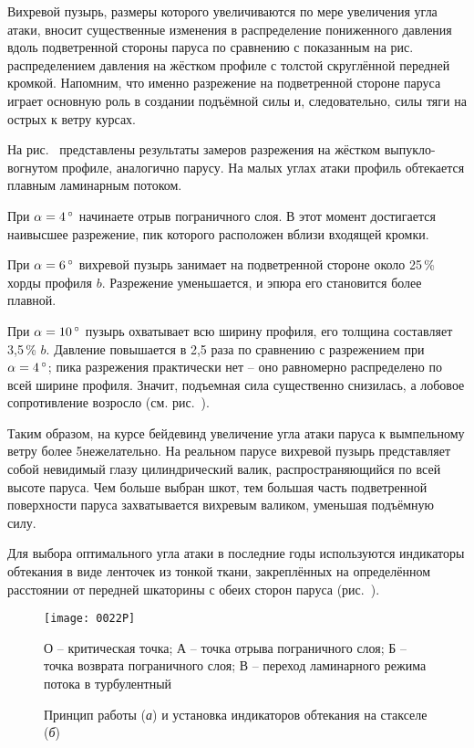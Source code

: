 Вихревой пузырь, размеры которого увеличиваются по мере увеличения угла атаки, вносит существенные изменения в распределение пониженного давления вдоль подветренной стороны паруса по сравнению с показанным на рис.~ распределением давления на жёстком профиле с толстой скруглённой передней кромкой. Напомним, что именно разрежение на подветренной стороне паруса играет основную роль в создании подъёмной силы и, следовательно, силы тяги на острых к ветру курсах. 

На рис.~ представлены результаты замеров разрежения на жёстком выпукло-вогнутом профиле, аналогично парусу. На малых углах атаки профиль обтекается плавным ламинарным потоком. 

При $\alpha = 4\,^\circ$ начинаете отрыв пограничного слоя. В этот момент достигается наивысшее разрежение, пик которого расположен вблизи входящей кромки.
 
При $\alpha = 6\,^\circ$ вихревой пузырь занимает на подветренной стороне около 25\,\% хорды профиля $b$. Разрежение уменьшается, и эпюра его становится более плавной. 

При $\alpha = 10\,^\circ$ пузырь охватывает всю ширину профиля, его толщина составляет 3,5\,\% $b$. Давление повышается в 2,5 раза по сравнению с разрежением при $\alpha = 4\,^\circ$; пика разрежения практически нет \--- оно равномерно распределено по всей ширине профиля. Значит, подъемная сила существенно снизилась, а лобовое сопротивление возросло (см. рис.~). 

Таким образом, на курсе бейдевинд увеличение угла атаки паруса к вымпельному ветру более 5\gr нежелательно. На реальном парусе вихревой пузырь представляет собой невидимый глазу цилиндрический валик, распространяющийся по всей высоте паруса. Чем больше выбран шкот, тем большая часть подветренной поверхности паруса захватывается вихревым валиком, уменьшая подъёмную силу. 

Для выбора оптимального угла атаки в последние годы используются индикаторы обтекания в виде ленточек из тонкой ткани, закреплённых на определённом расстоянии от передней шкаторины с обеих сторон паруса (рис.~).

\begin{figure*}[htb]
  \centering
  \texttt{[image: 0022P]}
  \caption{Принцип работы (\textit{а}) и установка индикаторов обтекания на стакселе (\textit{б})}
  \label{fig:22}
  \small
  \centering{}
  О \--- критическая точка; А \--- точка отрыва пограничного слоя; Б \--- точка возврата пограничного слоя; В \--- переход ламинарного режима потока в турбулентный
\end{figure*}

